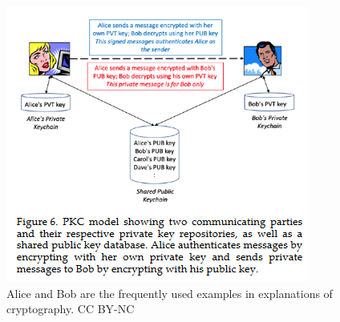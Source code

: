 \documentclass[12pt]{texMemo} %
\begin{document}
\begin{figure}[hb]
                \centering
                \includegraphics[width=0.5\linewidth]{AliceandBob.png}
                \caption{Alice and Bob are the frequently used examples in explanations of cryptography.  CC BY-NC}
                \label{fig:alice}
            \end{figure}
\clearpage
\printbibliography[heading=shortbib]
\newpage
\end{document}
